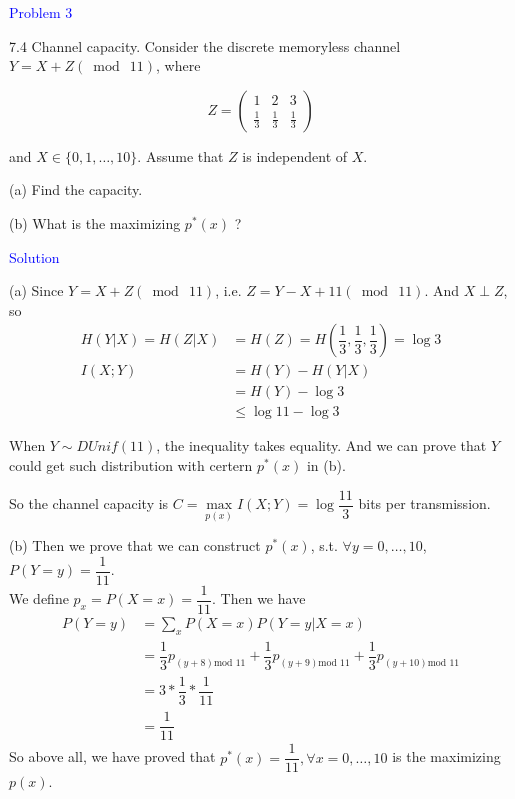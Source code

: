 \textcolor{blue}{Problem 3}

7.4 Channel capacity. Consider the discrete memoryless channel $Y=X+Z(\bmod\ 11)$, where

$$
Z=\left(\begin{array}{lll}
1 & 2 & 3 \\
\frac{1}{3} & \frac{1}{3} & \frac{1}{3}
\end{array}\right)
$$

and $X \in\{0,1, \ldots, 10\}$. Assume that $Z$ is independent of $X$.

(a) Find the capacity.

(b) What is the maximizing $p^*(x)$ ?

\textcolor{blue}{Solution}

(a) Since $Y=X+Z(\bmod\ 11)$, i.e. $Z=Y-X+11(\bmod\ 11)$. And $X\perp Z$, so
\begin{align*}
H(Y|X)=H(Z|X) &= H(Z)=H\left(\dfrac{1}{3},\dfrac{1}{3},\dfrac{1}{3}\right)=\log 3 \\
I(X;Y) &= H(Y)-H(Y|X) \\
&= H(Y) - \log 3 \\
&\leq \log 11 - \log 3
\end{align*}

When $Y\sim DUnif\left(11\right)$, the inequality takes equality. And we can prove that $Y$ could get such distribution with certern $p^*(x)$ in (b).

So the channel capacity is $C=\max\limits_{p(x)}I(X;Y)=\log \dfrac{11}{3}$ bits per transmission.

(b) Then we prove that we can construct $p^*(x)$, s.t. $\forall y=0,\ldots,10$, $P(Y=y)=\dfrac{1}{11}$. \\
We define $p_x=P(X=x)=\dfrac{1}{11}$. Then we have
\begin{align*}
P(Y=y) &= \sum_{x}P(X=x)P(Y=y|X=x) \\
&= \dfrac{1}{3}p_{(y+8)\text{mod\ } 11} + \dfrac{1}{3}p_{(y+9)\text{mod\ } 11} + \dfrac{1}{3}p_{(y+10)\text{mod\ } 11} \\
&= 3 * \dfrac{1}{3} * \dfrac{1}{11} \\
&= \dfrac{1}{11}
\end{align*}
So above all, we have proved that $p^*(x)=\dfrac{1}{11}, \forall x=0, \ldots, 10$ is the maximizing $p(x)$.

\newpage
